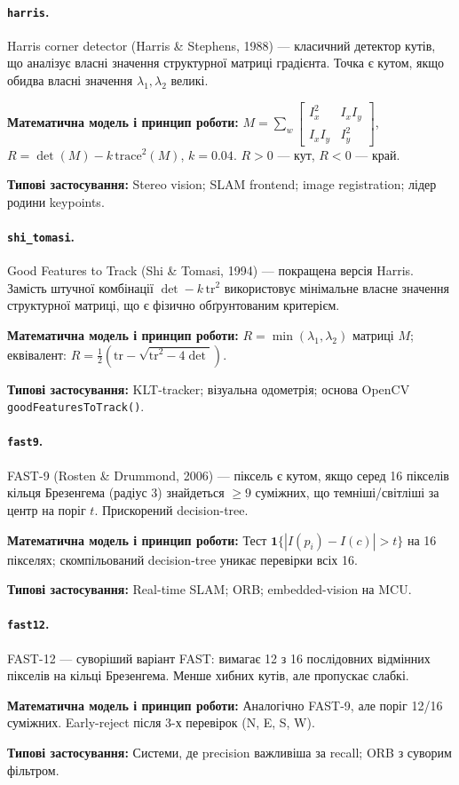 \documentclass[a4paper,12pt]{article}
\newcommand{\algodesc}[6]{%
	\paragraph{\texttt{#1}.} #2

	\textbf{Математична модель і принцип роботи:} #3

	\textbf{Типові застосування:} #6
	\par\medskip
}
\begin{document}
\algodesc{harris}
{Harris corner detector (Harris \& Stephens, 1988) --- класичний детектор кутів, що аналізує власні значення структурної матриці градієнта. Точка є кутом, якщо обидва власні значення $\lambda_1, \lambda_2$ великі.}
{$M=\sum_w \begin{bmatrix}I_x^2&I_xI_y\\I_xI_y&I_y^2\end{bmatrix}$, $R=\det(M)-k\,\mathrm{trace}^2(M)$, $k=0.04$. $R>0$ --- кут, $R<0$ --- край.}
{Інваріантний до повороту та добре узгоджується з класичною геометрією локальних ознак.}
{Не інваріантний до масштабу; у слабкотекстурних областях може давати розріджений відгук.}
{Stereo vision; SLAM frontend; image registration; лідер родини keypoints.}

\algodesc{shi\_tomasi}
{Good Features to Track (Shi \& Tomasi, 1994) --- покращена версія Harris. Замість штучної комбінації $\det-k\,\mathrm{tr}^2$ використовує мінімальне власне значення структурної матриці, що є фізично обґрунтованим критерієм.}
{$R=\min(\lambda_1,\lambda_2)$ матриці $M$; еквівалент: $R=\frac{1}{2}(\mathrm{tr}-\sqrt{\mathrm{tr}^2-4\det})$.}
{Стабільніший за Harris у слабкоконтрастних ділянках; усуває емпіричний коефіцієнт $k$.}
{Потребує обчислення квадратного кореня; так само, як і Harris, не є масштабно-інваріантним.}
{KLT-tracker; візуальна одометрія; основа OpenCV \texttt{goodFeaturesToTrack()}.}

\algodesc{fast9}
{FAST-9 (Rosten \& Drummond, 2006) --- піксель є кутом, якщо серед 16 пікселів кільця Брезенгема (радіус 3) знайдеться $\ge9$ суміжних, що темніші/світліші за центр на поріг $t$. Прискорений decision-tree.}
{Тест $\mathbf{1}\{|I(p_i)-I(c)|>t\}$ на 16 пікселях; скомпільований decision-tree уникає перевірки всіх 16.}
{Надзвичайно швидкий логічний тест; використовується як база в ORB-подібних схемах.}
{Без NMS дає багато хибних спрацювань; не інваріантний до повороту/масштабу; не формує дескриптор самостійно.}
{Real-time SLAM; ORB; embedded-vision на MCU.}

\algodesc{fast12}
{FAST-12 --- суворіший варіант FAST: вимагає 12 з 16 послідовних відмінних пікселів на кільці Брезенгема. Менше хибних кутів, але пропускає слабкі.}
{Аналогічно FAST-9, але поріг 12/16 суміжних. Early-reject після 3-х перевірок (N, E, S, W).}
{Дає менше false positives порівняно з FAST-9 і формує більш суворий відбір кутів.}
{Може пропускати справжні слабкі кути через жорсткіший критерій.}
{Системи, де precision важливіша за recall; ORB з суворим фільтром.}
\end{document}
